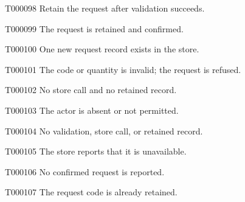 \documentclass[11pt,a4paper]{article}
\begin{document}
\begin{atlasparagraph}{T000098}
Retain the request after validation succeeds.
\end{atlasparagraph}
\begin{atlasparagraph}{T000099}
The request is retained and confirmed.
\end{atlasparagraph}
\begin{atlasparagraph}{T000100}
One new request record exists in the store.
\end{atlasparagraph}
\begin{atlasparagraph}{T000101}
The code or quantity is invalid; the request is refused.
\end{atlasparagraph}
\begin{atlasparagraph}{T000102}
No store call and no retained record.
\end{atlasparagraph}
\begin{atlasparagraph}{T000103}
The actor is absent or not permitted.
\end{atlasparagraph}
\begin{atlasparagraph}{T000104}
No validation, store call, or retained record.
\end{atlasparagraph}
\begin{atlasparagraph}{T000105}
The store reports that it is unavailable.
\end{atlasparagraph}
\begin{atlasparagraph}{T000106}
No confirmed request is reported.
\end{atlasparagraph}
\begin{atlasparagraph}{T000107}
The request code is already retained.
\end{atlasparagraph}
\end{document}

